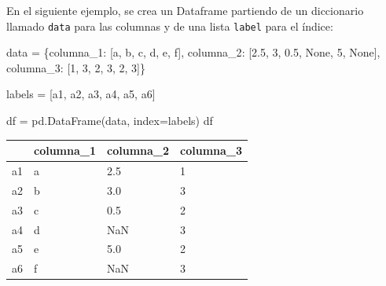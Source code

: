 \documentclass[
  letterpaper,
  DIV=11,
  numbers=noendperiod]{scrreprt}
\newenvironment{Shaded}{\begin{snugshade}}{\end{snugshade}}
\newcommand{\DecValTok}[1]{\textcolor[rgb]{0.68,0.00,0.00}{#1}}
\newcommand{\FloatTok}[1]{\textcolor[rgb]{0.68,0.00,0.00}{#1}}
\newcommand{\NormalTok}[1]{\textcolor[rgb]{0.00,0.23,0.31}{#1}}
\newcommand{\OperatorTok}[1]{\textcolor[rgb]{0.37,0.37,0.37}{#1}}
\newcommand{\StringTok}[1]{\textcolor[rgb]{0.13,0.47,0.30}{#1}}
\newcommand{\VariableTok}[1]{\textcolor[rgb]{0.07,0.07,0.07}{#1}}
\begin{document}
En el siguiente ejemplo, se crea un Dataframe partiendo de un
diccionario llamado \texttt{data} para las columnas y de una lista
\texttt{label} para el índice:

\begin{Shaded}
\begin{Highlighting}[]
\NormalTok{data }\OperatorTok{=}\NormalTok{ \{}\StringTok{\textquotesingle{}columna\_1\textquotesingle{}}\NormalTok{: [}\StringTok{\textquotesingle{}a\textquotesingle{}}\NormalTok{, }\StringTok{\textquotesingle{}b\textquotesingle{}}\NormalTok{, }\StringTok{\textquotesingle{}c\textquotesingle{}}\NormalTok{, }\StringTok{\textquotesingle{}d\textquotesingle{}}\NormalTok{, }\StringTok{\textquotesingle{}e\textquotesingle{}}\NormalTok{, }\StringTok{\textquotesingle{}f\textquotesingle{}}\NormalTok{],}
        \StringTok{\textquotesingle{}columna\_2\textquotesingle{}}\NormalTok{: [}\FloatTok{2.5}\NormalTok{, }\DecValTok{3}\NormalTok{, }\FloatTok{0.5}\NormalTok{, }\VariableTok{None}\NormalTok{, }\DecValTok{5}\NormalTok{, }\VariableTok{None}\NormalTok{],}
        \StringTok{\textquotesingle{}columna\_3\textquotesingle{}}\NormalTok{: [}\DecValTok{1}\NormalTok{, }\DecValTok{3}\NormalTok{, }\DecValTok{2}\NormalTok{, }\DecValTok{3}\NormalTok{, }\DecValTok{2}\NormalTok{, }\DecValTok{3}\NormalTok{]\}}

\NormalTok{labels }\OperatorTok{=}\NormalTok{ [}\StringTok{\textquotesingle{}a1\textquotesingle{}}\NormalTok{, }\StringTok{\textquotesingle{}a2\textquotesingle{}}\NormalTok{, }\StringTok{\textquotesingle{}a3\textquotesingle{}}\NormalTok{, }\StringTok{\textquotesingle{}a4\textquotesingle{}}\NormalTok{, }\StringTok{\textquotesingle{}a5\textquotesingle{}}\NormalTok{, }\StringTok{\textquotesingle{}a6\textquotesingle{}}\NormalTok{]}

\NormalTok{df }\OperatorTok{=}\NormalTok{ pd.DataFrame(data, index}\OperatorTok{=}\NormalTok{labels)}
\NormalTok{df}
\end{Highlighting}
\end{Shaded}

\begin{longtable}[]{@{}llll@{}}
\toprule\noalign{}
& columna\_1 & columna\_2 & columna\_3 \\
\midrule\noalign{}
\endhead
\bottomrule\noalign{}
\endlastfoot
a1 & a & 2.5 & 1 \\
a2 & b & 3.0 & 3 \\
a3 & c & 0.5 & 2 \\
a4 & d & NaN & 3 \\
a5 & e & 5.0 & 2 \\
a6 & f & NaN & 3 \\
\end{longtable}
\end{document}
